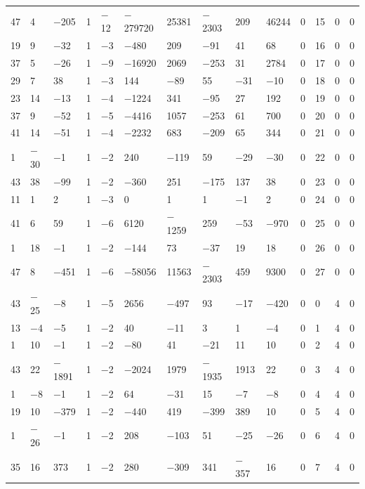 \documentclass[pdftex]{sigma}
\numberwithin{equation}{section}
\theoremstyle{definition}
\numberwithin{table}{section}
\begin{document}
{\begin{paracol}{3}
\begin{supertabular}{|w{c}{.32cm}w{c}{.32cm}w{c}{.32cm}@{\hspace{.5cm}}w{c}{.2cm}w{c}{.2cm}|@{\hspace{\tabcolsep}}HHHHHHw{c}{.17cm}w{c}{.17cm}w{c}{.17cm}|}
			47 & 4 & $-$205 & 1 & $-$12 & $-$279720 & 25381 & $-$2303 & 209 & 46244 & 0 & 15 & 0 & 0 \\
			19 & 9 & $-$32 & 1 & $-$3 & $-$480 & 209 & $-$91 & 41 & 68 & 0 & 16 & 0 & 0 \\
			37 & 5 & $-$26 & 1 & $-$9 & $-$16920 & 2069 & $-$253 & 31 & 2784 & 0 & 17 & 0 & 0 \\
			29 & 7 & 38 & 1 & $-$3 & 144 & $-$89 & 55 & $-$31 & $-$10 & 0 & 18 & 0 & 0 \\
			23 & 14 & $-$13 & 1 & $-$4 & $-$1224 & 341 & $-$95 & 27 & 192 & 0 & 19 & 0 & 0 \\
			37 & 9 & $-$52 & 1 & $-$5 & $-$4416 & 1057 & $-$253 & 61 & 700 & 0 & 20 & 0 & 0 \\
			41 & 14 & $-$51 & 1 & $-$4 & $-$2232 & 683 & $-$209 & 65 & 344 & 0 & 21 & 0 & 0 \\
			1 & $-$30 & $-$1 & 1 & $-$2 & 240 & $-$119 & 59 & $-$29 & $-$30 & 0 & 22 & 0 & 0 \\
			43 & 38 & $-$99 & 1 & $-$2 & $-$360 & 251 & $-$175 & 137 & 38 & 0 & 23 & 0 & 0 \\
			11 & 1 & 2 & 1 & $-$3 & 0 & 1 & 1 & $-$1 & 2 & 0 & 24 & 0 & 0 \\
			41 & 6 & 59 & 1 & $-$6 & 6120 & $-$1259 & 259 & $-$53 & $-$970 & 0 & 25 & 0 & 0 \\
			1 & 18 & $-$1 & 1 & $-$2 & $-$144 & 73 & $-$37 & 19 & 18 & 0 & 26 & 0 & 0 \\
			47 & 8 & $-$451 & 1 & $-$6 & $-$58056 & 11563 & $-$2303 & 459 & 9300 & 0 & 27 & 0 & 0 \\
			43 & $-$25 & $-$8 & 1 & $-$5 & 2656 & $-$497 & 93 & $-$17 & $-$420 & 0 & 0 & 4 & 0 \\
			13 & $-$4 & $-$5 & 1 & $-$2 & 40 & $-$11 & 3 & 1 & $-$4 & 0 & 1 & 4 & 0 \\
			1 & 10 & $-$1 & 1 & $-$2 & $-$80 & 41 & $-$21 & 11 & 10 & 0 & 2 & 4 & 0 \\
			43 & 22 & $-$1891 & 1 & $-$2 & $-$2024 & 1979 & $-$1935 & 1913 & 22 & 0 & 3 & 4 & 0 \\
			1 & $-$8 & $-$1 & 1 & $-$2 & 64 & $-$31 & 15 & $-$7 & $-$8 & 0 & 4 & 4 & 0 \\
			19 & 10 & $-$379 & 1 & $-$2 & $-$440 & 419 & $-$399 & 389 & 10 & 0 & 5 & 4 & 0 \\
			1 & $-$26 & $-$1 & 1 & $-$2 & 208 & $-$103 & 51 & $-$25 & $-$26 & 0 & 6 & 4 & 0 \\
			35 & 16 & 373 & 1 & $-$2 & 280 & $-$309 & 341 & $-$357 & 16 & 0 & 7 & 4 & 0 \\

\end{supertabular}
\end{paracol}}
\end{document}
